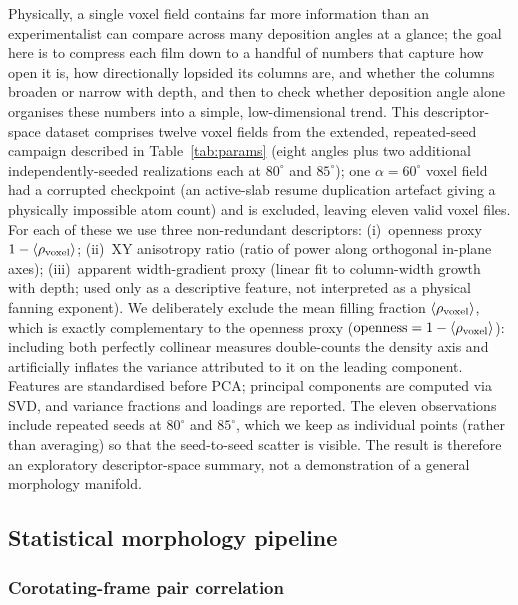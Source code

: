 \documentclass[aip,amsmath,amssymb,reprint]{revtex4-1}
\newcommand{\dang}{\ensuremath{\alpha}}
\begin{document}
Physically, a single voxel field contains far more information than an
experimentalist can compare across many deposition angles at a glance; the
goal here is to compress each film down to a handful of numbers that
capture how open it is, how directionally lopsided its columns are, and
whether the columns broaden or narrow with depth, and then to check
whether deposition angle alone organises these numbers into a simple,
low-dimensional trend.
This descriptor-space dataset comprises twelve voxel fields from the
extended, repeated-seed campaign described in Table~\ref{tab:params}
(eight angles plus two additional independently-seeded realizations each
at $80^{\circ}$ and $85^{\circ}$); one $\dang = 60^{\circ}$ voxel field had
a corrupted checkpoint (an active-slab resume duplication artefact giving a
physically impossible atom count) and is excluded, leaving eleven valid
voxel files. For each of these we use three non-redundant
descriptors:
(i)~openness proxy $1 - \langle\rho_{\rm voxel}\rangle$;
(ii)~XY anisotropy ratio (ratio of power along orthogonal in-plane axes);
(iii)~apparent width-gradient proxy (linear fit to column-width growth with
depth; used only as a descriptive feature, not interpreted as a
physical fanning exponent).
We deliberately exclude the mean filling fraction
$\langle\rho_{\rm voxel}\rangle$, which is exactly complementary to the
openness proxy ($\text{openness} = 1 - \langle\rho_{\rm voxel}\rangle$):
including both perfectly collinear measures double-counts the density axis
and artificially inflates the variance attributed to it on the leading
component.
Features are standardised before PCA; principal components are computed
via SVD, and variance fractions and loadings are reported.
The eleven observations include repeated seeds at $80^{\circ}$ and
$85^{\circ}$, which we keep as individual points (rather than averaging) so
that the seed-to-seed scatter is visible.
The result is therefore an exploratory descriptor-space summary, not a
demonstration of a general morphology manifold.

\subsection{Statistical morphology pipeline}
\label{ssec:nif_methods}

\subsubsection*{Corotating-frame pair correlation}
\end{document}
